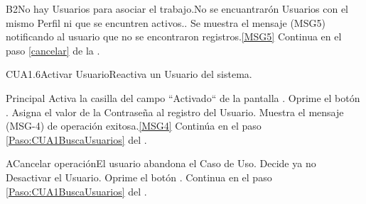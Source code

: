 	\begin{UCtrayectoriaA}{B2}{No hay Usuarios para asociar el trabajo.}{No se encuantrarón Usuarios con el mismo Perfil ni que se encuntren activos..}
			\UCpaso Se muestra el mensaje (MSG5) notificando al usuario que no se encontraron registros.\ref{MSG5}
			\UCpaso Continua en el paso \ref{cancelar} de la .
	\end{UCtrayectoriaA}


\begin{UseCase}{CUA1.6}{Activar Usuario}{Reactiva un Usuario del sistema.}
\end{UseCase}

	\begin{UCtrayectoria}{Principal}
			\UCpaso [\UCactor]Activa la casilla del campo ``Activado`` de la pantalla .
			\UCpaso [\UCactor]Oprime el botón .
			\UCpaso Asigna el valor de la Contraseña al registro del Usuario.
			\UCpaso Muestra el mensaje (MSG-4) de operación exitosa.\ref{MSG4}
			\UCpaso Continúa en el paso \ref{Paso:CUA1BuscaUsuarios} del .
	\end{UCtrayectoria}

	\begin{UCtrayectoriaA}{A}{Cancelar operación}{El usuario abandona el Caso de Uso.}
			\UCpaso[\UCactor] Decide ya no Desactivar el Usuario.
			\UCpaso[\UCactor] Oprime el botón .\label{cancelar}
			\UCpaso Continua en el paso \ref{Paso:CUA1BuscaUsuarios} del .
	\end{UCtrayectoriaA}
